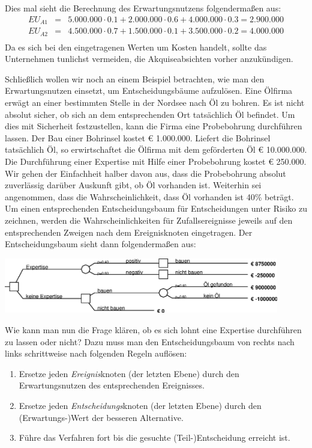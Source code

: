 Dies mal sieht die Berechnung des Erwartungsnutzens folgendermaßen aus:
\begin{eqnarray*}
EU_{A1} & = & 5.000.000 \cdot 0.1 + 2.000.000 \cdot 0.6 + 4.000.000 \cdot 0.3 =
2.900.000 \\ 
EU_{A2} & = & 4.500.000 \cdot 0.7 + 1.500.000 \cdot 0.1 + 3.500.000 \cdot 0.2 =
4.000.000 \\
\end{eqnarray*}
Da es sich bei den eingetragenen Werten um Kosten handelt, sollte das
Unternehmen tunlichst vermeiden, die Akquiseabsichten vorher anzukündigen.

Schließlich wollen wir noch an einem Beispiel betrachten, wie man den
Erwartungsnutzen einsetzt, um Entscheidungsbäume aufzulösen.
 Eine Ölfirma erwägt an einer
bestimmten Stelle in der Nordsee nach Öl zu bohren. Es ist nicht absolut sicher, 
ob sich an dem entsprechenden Ort
tatsächlich Öl befindet. Um dies mit Sicherheit festzustellen, kann die Firma
eine Probebohrung durchführen lassen. Der Bau einer Bohrinsel
kostet € 1.000.000. Liefert die Bohrinsel tatsächlich Öl, so erwirtschaftet die
Ölfirma mit dem geförderten Öl € 10.000.000. Die Durchführung einer
Expertise mit Hilfe einer Probebohrung kostet € 250.000. Wir gehen der
Einfachheit halber davon aus, dass die Probebohrung absolut zuverlässig darüber 
Auskunft gibt, ob Öl vorhanden
ist. Weiterhin sei angenommen, dass die Wahrscheinlichkeit, dass Öl vorhanden
ist 40\% beträgt. Um einen entsprechenden Entscheidungsbaum für Entscheidungen
unter Risiko zu zeichnen, werden die Wahrscheinlichkeiten für
Zufallsereignisse jeweils auf den entsprechenden Zweigen nach dem
Ereignisknoten eingetragen. Der Entscheidungsbaum sieht dann folgendermaßen aus:
\begin{center}
\includegraphics[width=12cm]{Grafiken/Beispiel6_3A.eps}
\end{center}
Wie kann man nun die Frage klären, ob es sich lohnt eine Expertise durchführen
zu lassen oder nicht? Dazu muss man den Entscheidungsbaum von rechts nach links
schrittweise nach folgenden Regeln auflösen:
\begin{enumerate}
  \item Ersetze jeden {\em Ereignis}knoten (der letzten Ebene) durch den
  Erwartungsnutzen des entsprechenden Ereignisses.
  \item Ersetze jeden {\em Entscheidungs}knoten (der letzten Ebene) durch den
  (Erwartungs-)Wert der besseren Alternative.
  \item Führe das Verfahren fort bis die gesuchte (Teil-)Entscheidung erreicht
  ist.
\end{enumerate} 
